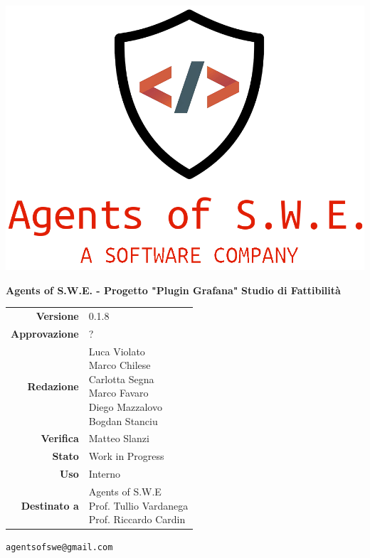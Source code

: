


\begin{titlepage}
\thispagestyle{empty}

\begin{center}

\includegraphics[scale=0.3]{./images/logo.png} 

\large \textbf{Agents of S.W.E. - Progetto "Plugin Grafana"}
\vfill
\Huge \textbf{Studio di Fattibilità}
\vfill
\large
\renewcommand{\arraystretch}{1.3}
\begin{tabular}{r|l}
\textbf{Versione} & 0.1.8\\
\textbf{Approvazione} & ?\\
\textbf{Redazione} & \parbox[t]{5cm}{Luca Violato\\Marco Chilese\\Carlotta Segna\\Marco Favaro\\Diego Mazzalovo\\Bogdan Stanciu}\\
\textbf{Verifica} & \parbox[t]{5cm}{Matteo Slanzi}\\
\textbf{Stato} & Work in Progress\\
\textbf{Uso} & Interno\\
\textbf{Destinato a} & \parbox[t]{5cm}{Agents of S.W.E \\Prof. Tullio Vardanega\\Prof. Riccardo Cardin}
\end{tabular}
\vfill
\small
\texttt{agentsofswe@gmail.com}
\end{center}
\end{titlepage}

